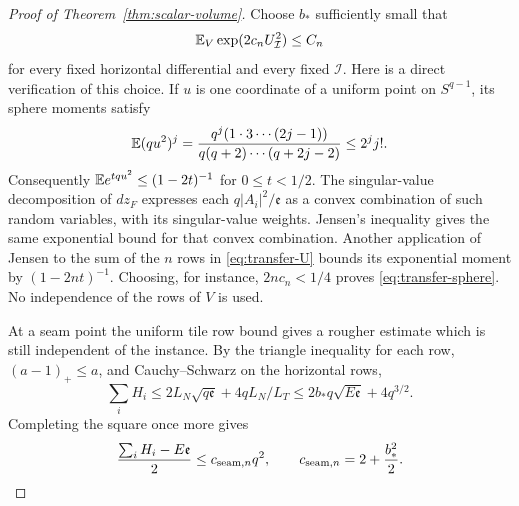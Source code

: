 \begin{proof}[Proof of Theorem~\ref{thm:scalar-volume}]
Choose \(b_*\) sufficiently small that
\begin{equation}\label{eq:transfer-sphere}
                  \mathbb E_V\exp(2c_nU_{\mathcal I}^2)\leq C_n
\end{equation}
for every fixed horizontal differential and every fixed
\(\mathcal I\).  Here is a direct verification of this choice.  If
\(u\) is one coordinate of a uniform point on \(S^{q-1}\), its sphere
moments satisfy
\[
 \mathbb E(q u^2)^j
   =\frac{q^j(1\cdot3\cdots(2j-1))}{q(q+2)\cdots(q+2j-2)}
   \leq2^j j!.
\]
Consequently \(\mathbb E e^{tqu^2}\leq(1-2t)^{-1}\) for \(0\leq t<1/2\).
The singular-value decomposition of \(dz_F\) expresses each
\(q|A_i|^2/\mathfrak e\) as a convex combination of such random
variables, with its singular-value weights.  Jensen's inequality
gives the same exponential bound for that convex combination.
Another application of Jensen to the sum of the \(n\) rows in
\eqref{eq:transfer-U} bounds its exponential moment by
\((1-2nt)^{-1}\).  Choosing, for instance, \(2nc_n<1/4\) proves
\eqref{eq:transfer-sphere}.  No independence of the rows of \(V\)
is used.

At a seam point the uniform tile row bound gives a rougher estimate
which is still independent of the instance.  By the triangle inequality
for each row, \((a-1)_+\leq a\), and Cauchy--Schwarz on the horizontal
rows,
\[
 \sum_iH_i\leq 2L_N\sqrt{q\mathfrak e}
                   +4q L_N/L_T
       \leq2b_*q\sqrt{E\mathfrak e}+4q^{3/2}.
\]
Completing the square once more gives
\begin{equation}\label{eq:transfer-seam-penalty}
 \frac{\sum_iH_i-E\mathfrak e}{2}\leq c_{{\rm seam},n}q^2,
                 \qquad c_{{\rm seam},n}=2+\frac{b_*^2}{2}.
\end{equation}


\end{proof}
